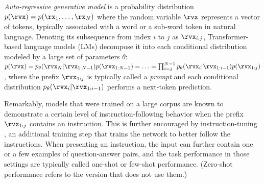 \emph{Auto-regressive generative model} is a probability distribution
$p(\rvx)=p(\rx_1,\ldots,\rx_N)$ where the random variable $\rvx$ represents a vector of tokens,
typically associated with a word or a sub-word token in natural language.
Denoting its subsequence from index $i$ to $j$ as $\rvx_{i:j}$,
Transformer-based language models (LMs) \cite{vaswani2017attention}
decompose it into each conditional distribution modeled by a large set of parameters $\theta$:
$p(\rvx)= p_\theta(\rvx_N|\rvx_{1:N-1})p(\rvx_{1:N-1}) = \ldots = \prod_{i=j}^{N-1} p_\theta(\rvx_i|\rvx_{1:i-1}) p(\rvx_{1:j})$,
where the prefix $\rvx_{1:j}$ is typically called a \emph{prompt} and
each conditional distribution $p_\theta(\rvx_i|\rvx_{1:i-1})$ performs a next-token prediction.

Remarkably, models that were trained on a large corpus
are known to demonstrate a certain level of instruction-following behavior
when the prefix $\rvx_{1:j}$ contains an instruction.
This is further encouraged by instruction-tuning \cite{ouyang2022training},
an additional training step that trains the network to better follow the instructions.
%
When presenting an instruction, the input can further contain one or a few examples of question-answer pairs,
and the task performance in those settings are typically called one-shot or few-shot performance.
(Zero-shot performance refers to the version that does not use them.)

